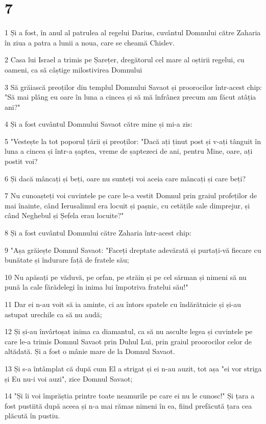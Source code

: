 \chapter{7}

\par 1 Și a fost, în anul al patrulea al regelui Darius, cuvântul Domnului către Zaharia în ziua a patra a lunii a noua, care se cheamă Chislev.
\par 2 Casa lui Israel a trimis pe Șarețer, dregătorul cel mare al oștirii regelui, cu oameni, ca să câștige milostivirea Domnului
\par 3 Să grăiască preoților din templul Domnului Savaot și proorocilor într-acest chip: "Să mai plâng eu oare în luna a cincea și să mă înfrânez precum am făcut atâția ani?"
\par 4 Și a fost cuvântul Domnului Savaot către mine și mi-a zis:
\par 5 "Vestește la tot poporul țării și preoților: "Dacă ați ținut post și v-ați tânguit în luna a cincea și într-a șaptea, vreme de șaptezeci de ani, pentru Mine, oare, ați postit voi?
\par 6 Și dacă mâncați și beți, oare nu sunteți voi aceia care mâncați și care beți?
\par 7 Nu cunoașteți voi cuvintele pe care le-a vestit Domnul prin graiul profeților de mai înainte, când Ierusalimul era locuit și pașnic, cu cetățile sale dimprejur, și când Neghebul și Șefela erau locuite?"
\par 8 Și a fost cuvântul Domnului către Zaharia într-acest chip:
\par 9 "Așa grăiește Domnul Savaot: "Faceți dreptate adevărată și purtați-vă fiecare cu bunătate și îndurare față de fratele său;
\par 10 Nu apăsați pe văduvă, pe orfan, pe străin și pe cel sărman și nimeni să nu pună la cale fărădelegi în inima lui împotriva fratelui său!"
\par 11 Dar ei n-au voit să ia aminte, ci au întors spatele cu îndărătnicie și și-au astupat urechile ca să nu audă;
\par 12 Și și-au învârtoșat inima ca diamantul, ca să nu asculte legea și cuvintele pe care le-a trimis Domnul Savaot prin Duhul Lui, prin graiul proorocilor celor de altădată. Și a fost o mânie mare de la Domnul Savaot.
\par 13 Și s-a întâmplat că după cum El a strigat și ei n-au auzit, tot așa "ei vor striga și Eu nu-i voi auzi", zice Domnul Savaot;
\par 14 "Și îi voi împrăștia printre toate neamurile pe care ei nu le cunosc!" Și țara a fost pustiită după aceea și n-a mai rămas nimeni în ea, fiind prefăcută țara cea plăcută în pustiu.

